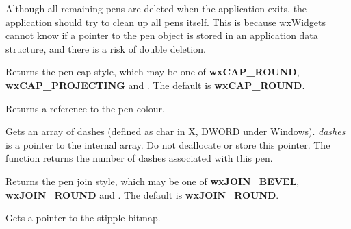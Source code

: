 
Although all remaining pens are deleted when the application exits,
the application should try to clean up all pens itself. This is because
wxWidgets cannot know if a pointer to the pen object is stored in an
application data structure, and there is a risk of double deletion.

\label{wxpengetcap}


Returns the pen cap style, which may be one of {\bf wxCAP\_ROUND}, {\bf wxCAP\_PROJECTING} and
. The default is {\bf wxCAP\_ROUND}.



\label{wxpengetcolour}


Returns a reference to the pen colour.



\label{wxpengetdashes}


Gets an array of dashes (defined as char in X, DWORD under Windows).
{\it dashes} is a pointer to the internal array. Do not deallocate or store this pointer.
The function returns the number of dashes associated with this pen.



\label{wxpengetjoin}


Returns the pen join style, which may be one of {\bf wxJOIN\_BEVEL}, {\bf wxJOIN\_ROUND} and
. The default is {\bf wxJOIN\_ROUND}.



\label{wxpengetstipple}


Gets a pointer to the stipple bitmap.

